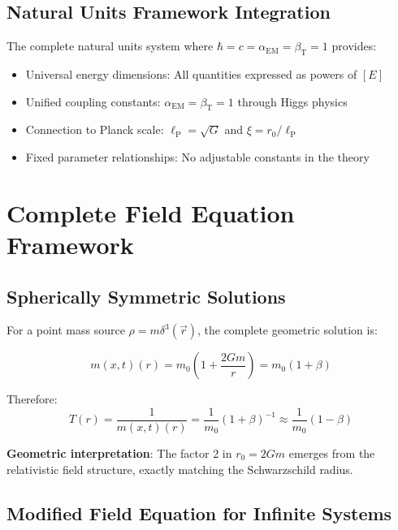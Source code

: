 \documentclass[12pt,a4paper]{article}
\newcommand{\mfield}{m(x,t)}
\newcommand{\lP}{\ell_{\text{P}}}
\theoremstyle{definition}
\theoremstyle{remark}
\begin{document}
	\subsection{Natural Units Framework Integration}
	\label{subsec:natural_units_integration}
	
	The complete natural units system where $\hbar = c = \alpha_{\text{EM}} = \beta_{\text{T}} = 1$ provides:
	\begin{itemize}
		\item Universal energy dimensions: All quantities expressed as powers of $[E]$
		\item Unified coupling constants: $\alpha_{\text{EM}} = \beta_{\text{T}} = 1$ through Higgs physics
		\item Connection to Planck scale: $\lP = \sqrt{G}$ and $\xi = r_0/\lP$
		\item Fixed parameter relationships: No adjustable constants in the theory
	\end{itemize}
	
	\section{Complete Field Equation Framework}
	\label{sec:field_equation_framework}
	
	\subsection{Spherically Symmetric Solutions}
	\label{subsec:spherical_solutions}
	
	For a point mass source $\rho = m \delta^3(\vec{r})$, the complete geometric solution is:
	
	\begin{equation}
		\mfield(r) = m_0\left(1 + \frac{2Gm}{r}\right) = m_0(1 + \beta)
		\label{eq:mass_field_solution}
	\end{equation}
	
	Therefore:
	\begin{equation}
		T(r) = \frac{1}{\mfield(r)} = \frac{1}{m_0}(1 + \beta)^{-1} \approx \frac{1}{m_0}(1 - \beta)
		\label{eq:time_field_solution}
	\end{equation}
	
	\textbf{Geometric interpretation}: The factor 2 in $r_0 = 2Gm$ emerges from the relativistic field structure, exactly matching the Schwarzschild radius.
	
	\subsection{Modified Field Equation for Infinite Systems}
	\label{subsec:infinite_systems}
	
\end{document}
